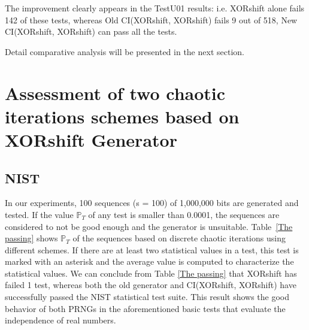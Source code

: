 The improvement clearly appears in the TestU01 results: i.e. XORshift alone fails 142 of these tests, whereas  Old CI(XORshift, XORshift) fails 9 out of 518, New CI(XORshift, XORshift) can pass all the tests. 

Detail comparative analysis will be presented in the next section.


\section{Assessment of two chaotic iterations schemes based on XORshift Generator}

\subsection{NIST}

In our experiments, 100 sequences (s = 100) of 1,000,000 bits are generated and tested. If the value $\mathbb{P}_T$ of any test is smaller than 0.0001, the sequences are considered to not be good enough and the generator is unsuitable. Table~\ref{The passing} shows $\mathbb{P}_T$ of the sequences based on discrete chaotic iterations using different schemes. If there are at least two statistical values in a test, this test is marked with an asterisk and the average value is computed to characterize the statistical values. 
We can conclude from Table \ref{The passing} that XORshift has failed 1 test, whereas both the old generator and CI(XORshift, XORshift) have successfully passed the NIST statistical test suite. This result shows the good behavior of both PRNGs in the aforementioned basic tests that evaluate the independence of real numbers.

